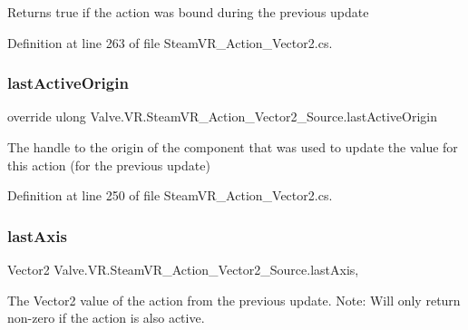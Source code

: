 Returns true if the action was bound during the previous update 



Definition at line 263 of file Steam\+V\+R\+\_\+\+Action\+\_\+\+Vector2.\+cs.

\mbox{\label{class_valve_1_1_v_r_1_1_steam_v_r___action___vector2___source_aefafa6d818b7ee85cc6e020b5140f24e}} 
\subsubsection{\texorpdfstring{lastActiveOrigin}{lastActiveOrigin}}
{\footnotesize\ttfamily override ulong Valve.\+V\+R.\+Steam\+V\+R\+\_\+\+Action\+\_\+\+Vector2\+\_\+\+Source.\+last\+Active\+Origin\hspace{0.3cm}{\ttfamily [get]}}



The handle to the origin of the component that was used to update the value for this action (for the previous update) 



Definition at line 250 of file Steam\+V\+R\+\_\+\+Action\+\_\+\+Vector2.\+cs.

\mbox{\label{class_valve_1_1_v_r_1_1_steam_v_r___action___vector2___source_aafd1e951222e420aabc63773f158f741}} 
\subsubsection{\texorpdfstring{lastAxis}{lastAxis}}
{\footnotesize\ttfamily Vector2 Valve.\+V\+R.\+Steam\+V\+R\+\_\+\+Action\+\_\+\+Vector2\+\_\+\+Source.\+last\+Axis\hspace{0.3cm}{\ttfamily [get]}, {}}



The Vector2 value of the action from the previous update. Note\+: Will only return non-\/zero if the action is also active. 



